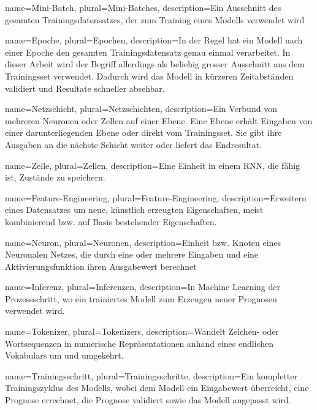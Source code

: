 \usepackage{glossaries}

\makeglossaries

{
name=Mini-Batch,
plural=Mini-Batches,
description={Ein Ausschnitt des gesamten Trainingsdatensatzes, der zum Training eines Modells verwendet wird}
}

{
name=Epoche,
plural=Epochen,
description={In der Regel hat ein Modell nach einer Epoche den gesamten Trainingsdatensatz genau einmal verarbeitet. In dieser Arbeit wird der Begriff allerdings als beliebig grosser Ausschnitt aus dem Trainingsset verwendet. Dadurch wird das Modell in kürzeren Zeitabständen validiert und Resultate schneller absehbar.}
}

{
name=Netzschicht,
plural=Netzschichten,
description={Ein Verbund von mehreren Neuronen oder Zellen auf einer Ebene. Eine Ebene erhält Eingaben von einer darunterliegenden Ebene oder direkt vom Trainingsset. Sie gibt ihre Ausgaben an die nächste Schicht weiter oder liefert das Endresultat.}
}

{
name=Zelle,
plural=Zellen,
description={Eine Einheit in einem RNN, die fähig ist, Zustände zu speichern.}
}

{
name=Feature-Engineering,
plural=Feature-Engineering,
description={Erweitern eines Datensatzes um neue, künstlich erzeugten Eigenschaften, meist kombinierend bzw. auf Basis bestehender Eigenschaften.}
}

{
name=Neuron,
plural=Neuronen,
description={Einheit bzw. Knoten eines Neuronalen Netzes, die durch eine oder mehrere Eingaben und eine Aktivierungsfunktion ihren Ausgabewert berechnet}
}

{
name=Inferenz,
plural=Inferenzen,
description={In Machine Learning der Prozessschritt, wo ein trainiertes Modell zum Erzeugen neuer Prognosen verwendet wird.}
}

{
name=Tokenizer,
plural=Tokenizers,
description={Wandelt Zeichen- oder Wortsequenzen in numerische Repräsentationen anhand eines endlichen Vokabulars um und umgekehrt.}
}

{
name=Trainingsschritt,
plural=Trainingsschritte,
description={Ein kompletter Trainingszyklus des Modells, wobei dem Modell ein Eingabewert überreicht, eine Prognose errechnet, die Prognose validiert sowie das Modell angepasst wird.}
}

